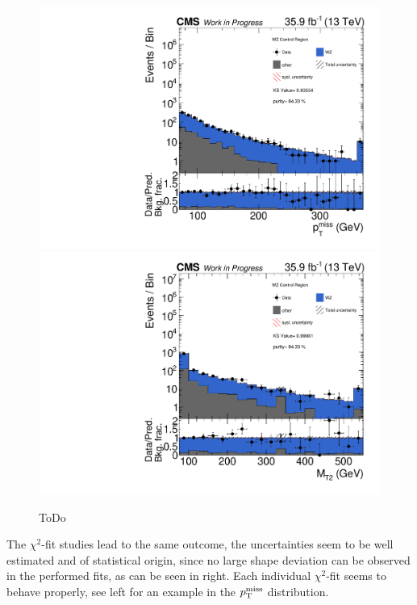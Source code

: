 \begin{figure}[tbp]
 \centering
 \includegraphics[width=\pairwidth]{figures/plots_CR_wz/CRWZ_LL_nom_met_log}
 \includegraphics[width=\pairwidth]{figures/plots_CR_wz/CRWZ_LL_nom_mt2_log}
 \caption{ToDo}
 \label{fig:CRWZ}
\end{figure}
The $\chi^2$-fit studies lead to the same outcome, the uncertainties seem to be well estimated and of statistical origin, since no large shape deviation can be observed in the performed fits, as can be seen in  right. Each individual $\chi^2$-fit seems to behave properly, see  left for an example in the $p_{\mathrm{T}}^\text{miss}$ distribution.

